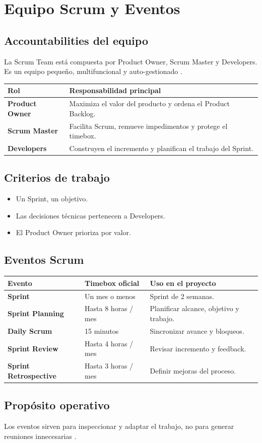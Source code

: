 \section{Equipo Scrum y Eventos}
\subsection{Accountabilities del equipo}
La Scrum Team est\'a compuesta por Product Owner, Scrum Master y Developers. Es un equipo peque\~no, multifuncional y auto-gestionado \cite{schwaber2020}.

\begin{table}[htbp]
\centering
\renewcommand{\arraystretch}{1.15}
\begin{tabularx}{\textwidth}{>{\bfseries}p{3.1cm} X}
\toprule
Rol & Responsabilidad principal \\
\midrule
Product Owner & Maximiza el valor del producto y ordena el Product Backlog. \\
Scrum Master & Facilita Scrum, remueve impedimentos y protege el timebox. \\
Developers & Construyen el incremento y planifican el trabajo del Sprint. \\
\bottomrule
\end{tabularx}
\end{table}

\subsection{Criterios de trabajo}
\begin{itemize}[leftmargin=*]
    \item Un Sprint, un objetivo.
    \item Las decisiones t\'ecnicas pertenecen a Developers.
    \item El Product Owner prioriza por valor.
\end{itemize}

\subsection{Eventos Scrum}
\begin{table}[htbp]
\centering
\renewcommand{\arraystretch}{1.08}
\begin{tabularx}{\textwidth}{>{\bfseries}p{3cm} p{3cm} X}
\toprule
Evento & Timebox oficial & Uso en el proyecto \\
\midrule
Sprint & Un mes o menos & Sprint de 2 semanas. \\
Sprint Planning & Hasta 8 horas / mes & Planificar alcance, objetivo y trabajo. \\
Daily Scrum & 15 minutos & Sincronizar avance y bloqueos. \\
Sprint Review & Hasta 4 horas / mes & Revisar incremento y feedback. \\
Sprint Retrospective & Hasta 3 horas / mes & Definir mejoras del proceso. \\
\bottomrule
\end{tabularx}
\end{table}

\subsection{Prop\'osito operativo}
Los eventos sirven para inspeccionar y adaptar el trabajo, no para generar reuniones innecesarias \cite{schwaber2020}.
